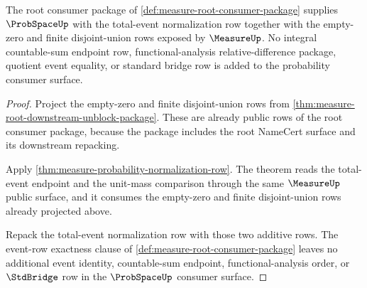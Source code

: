 \begin{theorem}
\label{thm:measure-probability-consumer-rows}
The root consumer package of
\autoref{def:measure-root-consumer-package} supplies $\ProbSpaceUp$ with the
total-event normalization row together with the empty-zero and finite
disjoint-union rows exposed by $\MeasureUp$. No integral countable-sum
endpoint row, functional-analysis relative-difference package, quotient event
equality, or standard bridge row is added to the probability consumer surface.
\end{theorem}
\begin{proof}
Project the empty-zero and finite disjoint-union rows from
\autoref{thm:measure-root-downstream-unblock-package}. These are already
public rows of the root consumer package, because the package includes the
root NameCert surface and its downstream repacking.

Apply \autoref{thm:measure-probability-normalization-row}. The theorem reads
the total-event endpoint and the unit-mass comparison through the same
$\MeasureUp$ public surface, and it consumes the empty-zero and finite
disjoint-union rows already projected above.

Repack the total-event normalization row with those two additive rows. The
event-row exactness clause of
\autoref{def:measure-root-consumer-package} leaves no additional event
identity, countable-sum endpoint, functional-analysis order, or
$\StdBridge$ row in the $\ProbSpaceUp$ consumer surface.
\end{proof}

